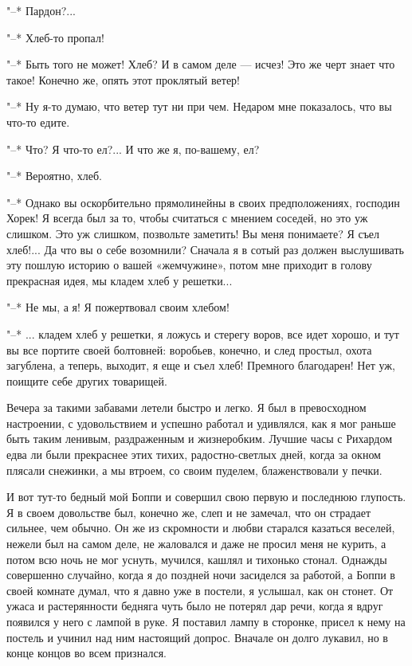 "--* Пардон?...

"--* Хлеб-то пропал!

"--* Быть того не  может! Хлеб? И в самом деле ---  исчез! Это же черт
знает что такое! Конечно же, опять этот проклятый ветер!

"--* Ну я-то думаю, что ветер  тут ни при чем. Недаром мне показалось,
что вы что-то едите.

"--* Что? Я что-то ел?... И что же я, по-вашему, ел?

"--* Вероятно, хлеб.

"--*  Однако вы  оскорбительно  прямолинейны  в своих  предположениях,
господин Хорек! Я всегда был за то, чтобы считаться с мнением соседей,
но  это  уж слишком.  Это  уж  слишком,  позвольте заметить!  Вы  меня
понимаете? Я  съел хлеб!... Да  что вы о  себе возомнили? Сначала  я в
сотый раз должен  выслушивать эту пошлую историю  о вашей «жемчужине»,
потом  мне  приходит  в  голову  прекрасная идея,  мы  кладем  хлеб  у
решетки...

"--* Не мы, а я! Я пожертвовал своим хлебом!

"--* ...  кладем хлеб у  решетки, я ложусь  и стерегу воров,  все идет
хорошо, и  тут вы  все портите своей  болтовней: воробьев,  конечно, и
след простыл, охота  загублена, а теперь, выходит, я еще  и съел хлеб!
Премного благодарен! Нет уж, поищите себе других товарищей.

Вечера за такими забавами летели быстро  и легко. Я был в превосходном
настроении, с удовольствием  и успешно работал и удивлялся,  как я мог
раньше быть таким  ленивым, раздраженным и жизнеробким.  Лучшие часы с
Рихардом едва  ли были  прекраснее этих тихих,  радостно-светлых дней,
когда  за окном  плясали  снежинки,  а мы  втроем,  со своим  пуделем,
блаженствовали у печки.

И  вот тут-то  бедный мой  Боппи и  совершил свою  первую и  последнюю
глупость. Я в своем довольстве был, конечно же, слеп и не замечал, что
он страдает сильнее, чем обычно. Он  же из скромности и любви старался
казаться веселей,  нежели был на  самом деле,  не жаловался и  даже не
просил меня не курить, а потом всю ночь не мог уснуть, мучился, кашлял
и тихонько  стонал. Однажды  совершенно случайно,  когда я  до поздней
ночи засиделся за работой, а Боппи  в своей комнате думал, что я давно
уже в  постели, я  услышал, как  он стонет.  От ужаса  и растерянности
бедняга чуть было не потерял дар речи, когда я вдруг появился у него с
лампой в руке. Я поставил лампу в сторонке, присел к нему на постель и
учинил над ним настоящий допрос. Вначале  он долго лукавил, но в конце
концов во всем признался.

